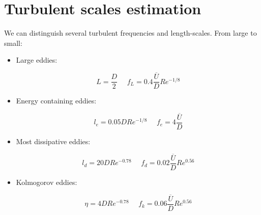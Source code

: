 \chapter{Turbulent scales estimation}
\label{app:turbulent_scales_estimation}



We can distinguish several turbulent frequencies and length-scales. From large to small:

\begin{itemize}

	\item Large eddies:
	
	\begin{equation}
	L = \frac{D}{2} ~~~~~~ f_L = 0.4 \frac{\overline{U}}{D} Re^{-1/8}
	\end{equation}

	\item Energy containing eddies:
	
	\begin{equation}
	l_e = 0.05 D Re^{-1/8} ~~~~~~ f_e = 4 \frac{\overline{U}}{D}
	\end{equation}

	\item Most dissipative eddies:
	
	\begin{equation}
	l_d = 20 D Re^{-0.78} ~~~~~~ f_d = 0.02 \frac{\overline{U}}{D} Re^{0.56}
	\end{equation}

	\item Kolmogorov eddies:
	
	\begin{equation}
	\eta = 4 D Re^{-0.78} ~~~~~~ f_k = 0.06 \frac{\overline{U}}{D} Re^{0.56}
	\end{equation}

\end{itemize}